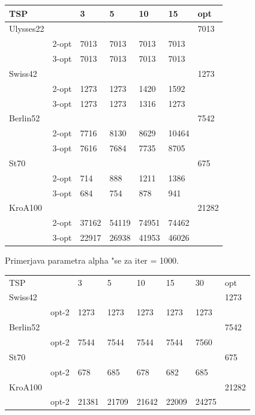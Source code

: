 \documentclass[12pt,a4paper]{amsart}
\theoremstyle{definition} %
\theoremstyle{plain} %
\begin{document}
\begin{table}[H]
\begin{tabular}{lllllll}
\rowcolor[HTML]{FFCCC9} 
TSP       &      & 3 & 5 & 10 & 15 &opt \\ \hline
Ulysses22 &      &   &   &    &  &7013  \\
          & 2-opt & 7013  &  7013 & 7013   & 7013   &\\
          & 3-opt &   7013&  7013 &  7013  &  7013 & \\
Swiss42   &      &   &   &    &   &1273 \\
	& 2-opt &   1273&  1273 &   1420 &  1592 & \\
          & 3-opt &  1273 &  1273 & 1316   &  1273 & \\
Berlin52 &      &   &   &    &   &7542 \\
	 & 2-opt &  7716 & 8130 &   8629 &  10464 & \\
          & 3-opt &  7616 &  7684 &  7735  & 8705  & \\
St70      &      &   &   &    &  & 675 \\
	& 2-opt &  714 &  888 &   1211 &  1386 & \\
          & 3-opt &  684 &  754 &   878 &   941& \\
KroA100   &      &   &   &    &  &21282  \\
	& 2-opt &  37162 &  54119 &   74951 &   74462& \\
          & 3-opt &  22917 &  26938 &  41953  & 46026  &
\end{tabular}
\end{table}

Primerjava parametra alpha "se za iter = 1000. 

\begin{table}[h]
\begin{tabular}{llllllll}
\rowcolor[HTML]{FFCCC9} 
TSP      &       & 3     & 5     & 10    & 15   & 30   & opt   \\
Swiss42 &       &       &       &       &      &      & 1273  \\
         & opt-2 & 1273  & 1273  & 1273  & 1273 & 1273 &       \\
Berlin52  &       &       &       &       &      &      & 7542  \\
         & opt-2 & 7544  & 7544  & 7544  & 7544 & 7560 &       \\
St70     &       &       &       &       &      &      & 675   \\
         & opt-2 & 678   & 685   & 678   & 682  & 685  &       \\
KroA100  &       &       &       &       &      &      & 21282 \\
         & opt-2 & 21381 & 21709 & 21642 &  22009    &  24275    &      
\end{tabular}
\end{table}
\end{document}
